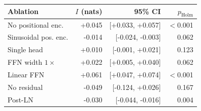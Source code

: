 \begin{tabular}{l r r r}
\toprule
Ablation & $I$ (nats) & 95\% CI & $p_\mathrm{Holm}$ \\
\midrule
No positional enc. & +0.045 & [+0.033, +0.057] & $<$0.001 \\
Sinusoidal pos. enc. & -0.014 & [-0.024, -0.003] & 0.062 \\
Single head & +0.010 & [-0.001, +0.021] & 0.123 \\
FFN width $1\times$ & +0.022 & [+0.005, +0.040] & 0.062 \\
Linear FFN & +0.061 & [+0.047, +0.074] & $<$0.001 \\
No residual & -0.049 & [-0.124, +0.026] & 0.167 \\
Post-LN & -0.030 & [-0.044, -0.016] & 0.004 \\
\bottomrule
\end{tabular}
